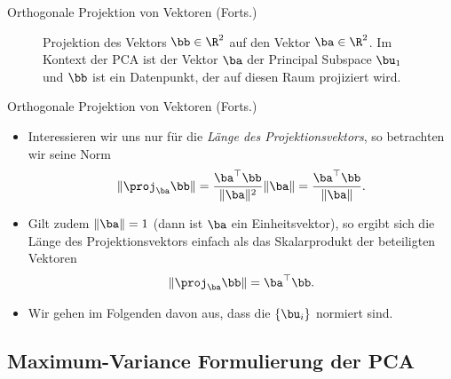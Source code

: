 \begin{frame}{Orthogonale Projektion von Vektoren (Forts.)}{}
	\begin{figure}
		
		\caption{Projektion des Vektors $\bb \in \R^2$ auf den Vektor $\ba \in \R^2$.
		Im Kontext der PCA ist der Vektor $\ba$ der Principal Subspace $\bu_1$ und $\bb$ ist ein Datenpunkt,
		der auf diesen Raum projiziert wird.}
	\end{figure}
\end{frame}


\begin{frame}{Orthogonale Projektion von Vektoren (Forts.)}{}
	\begin{itemize}
		\item Interessieren wir uns nur für die \textit{Länge des Projektionsvektors}, so betrachten wir seine Norm
		\begin{equation}
			\Vert \proj_{\ba} \bb \Vert
				= \frac{\ba^\top \bb}{\Vert \ba \Vert^2} \Vert \ba \Vert
				= \frac{\ba^\top \bb}{\Vert \ba \Vert}.
		\end{equation}
		\item Gilt zudem $\Vert \ba \Vert = 1$ (dann ist $\ba$ ein Einheitsvektor),
			so ergibt sich die Länge des Projektionsvektors einfach als das Skalarprodukt der beteiligten Vektoren
		\begin{equation}
			\Vert \proj_{\ba} \bb \Vert = \ba^\top \bb.
		\end{equation}
		\item Wir gehen im Folgenden davon aus, dass die  $\{ \bu_i \}$ normiert sind.
	\end{itemize}
\end{frame}


\subsection{Maximum-Variance Formulierung der PCA}

